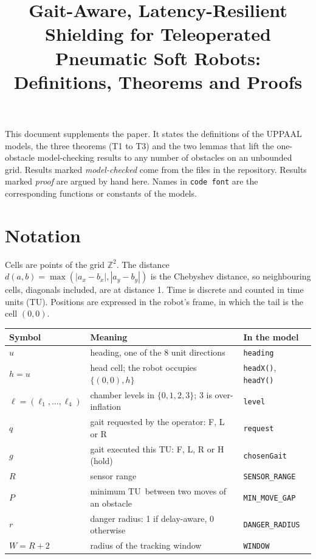 \documentclass[11pt,a4paper]{article}
\title{Gait-Aware, Latency-Resilient Shielding for Teleoperated Pneumatic Soft Robots:\\Definitions, Theorems and Proofs}
\date{}
\theoremstyle{definition}
\newcommand{\tu}{TU}
\begin{document}
\maketitle

This document supplements the paper. It states the definitions of the UPPAAL models, the three theorems (T1 to T3) and the two lemmas that lift the one-obstacle model-checking results to any number of obstacles on an unbounded grid. Results marked \emph{model-checked} come from the files in the repository. Results marked \emph{proof} are argued by hand here. Names in \texttt{code font} are the corresponding functions or constants of the models.

\section{Notation}

Cells are points of the grid $\mathbb{Z}^2$. The distance $d(a,b)=\max(|a_x-b_x|,|a_y-b_y|)$ is the Chebyshev distance, so neighbouring cells, diagonals included, are at distance 1. Time is discrete and counted in time units (\tu). Positions are expressed in the robot's frame, in which the tail is the cell $(0,0)$.

\begin{center}
\begin{tabular}{@{}lll@{}}
\toprule
Symbol & Meaning & In the model \\
\midrule
$u$ & heading, one of the 8 unit directions & \texttt{heading} \\
$h=u$ & head cell; the robot occupies $\{(0,0),h\}$ & \texttt{headX()}, \texttt{headY()} \\
$\ell=(\ell_1,\dots,\ell_4)$ & chamber levels in $\{0,1,2,3\}$; 3 is over-inflation & \texttt{level} \\
$q$ & gait requested by the operator: F, L or R & \texttt{request} \\
$g$ & gait executed this \tu: F, L, R or H (hold) & \texttt{chosenGait} \\
$R$ & sensor range & \texttt{SENSOR\_RANGE} \\
$P$ & minimum \tu\ between two moves of an obstacle & \texttt{MIN\_MOVE\_GAP} \\
$r$ & danger radius: 1 if delay-aware, 0 otherwise & \texttt{DANGER\_RADIUS} \\
$W=R+2$ & radius of the tracking window & \texttt{WINDOW} \\
\bottomrule
\end{tabular}
\end{center}
\end{document}
